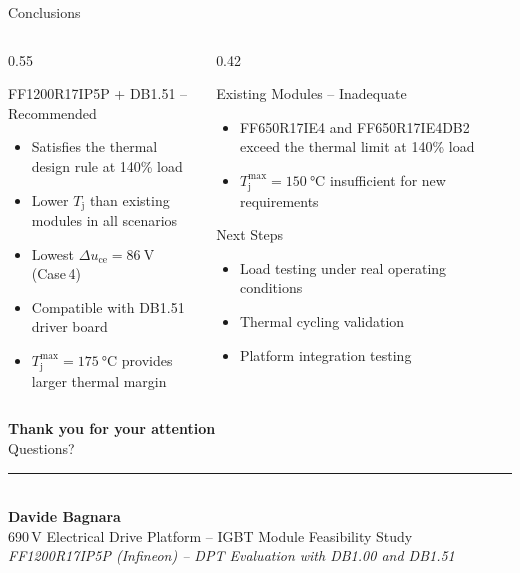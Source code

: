 \documentclass[aspectratio=169, 10pt]{beamer}
\begin{document}
\begin{frame}{Conclusions}
  \begin{columns}[T]
    \begin{column}{0.55\textwidth}
      \begin{exampleblock}{{FF1200R17IP5P + DB1.51 -- Recommended}}
        \begin{itemize}
          \item Satisfies the thermal design rule at 140\% load
          \item Lower $T_\text{j}$ than existing modules in all scenarios
          \item Lowest $\Delta u_\text{ce} = \SI{86}{\volt}$ (Case\,4)
          \item Compatible with DB1.51 driver board
          \item $T_\text{j}^\text{max} = \SI{175}{\celsius}$ provides larger thermal margin
        \end{itemize}
      \end{exampleblock}
    \end{column}
    \begin{column}{0.42\textwidth}
      \begin{alertblock}{{Existing Modules -- Inadequate}}
        \begin{itemize}
          \item FF650R17IE4 and FF650R17IE4DB2 exceed the thermal limit at 140\% load
          \item $T_\text{j}^\text{max} = \SI{150}{\celsius}$ insufficient for new requirements
        \end{itemize}
      \end{alertblock}
      \vspace{6pt}
      \begin{block}{Next Steps}
        \begin{itemize}
          \item Load testing under real operating conditions
          \item Thermal cycling validation
          \item Platform integration testing
        \end{itemize}
      \end{block}
    \end{column}
  \end{columns}
\end{frame}

\begin{frame}
  \centering
  \vspace{20pt}
  {\Large\textbf{Thank you for your attention}}\\[16pt]
  {\large Questions?}\\[24pt]
  \textcolor{leitgray}{\rule{0.6\textwidth}{0.4pt}}\\[10pt]
  \small
  \textbf{Davide Bagnara}\\
  690\,V Electrical Drive Platform -- IGBT Module Feasibility Study\\[6pt]
  \textit{FF1200R17IP5P (Infineon) -- DPT Evaluation with DB1.00 and DB1.51}
\end{frame}
\end{document}
